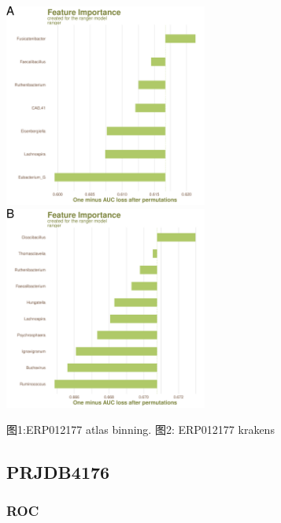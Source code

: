 \documentclass[
]{article}
\begin{document}
\includegraphics[width=0.5\textwidth,height=0.5\textheight]{../../Analysis_shotgun_ERP012177/03_ML/shotgun/atlas_binning/ERP012177_binning_best.model_draw_feature_importance_plot.png}
\includegraphics[width=0.5\textwidth,height=0.5\textheight]{../../Analysis_shotgun_ERP012177/03_ML/shotgun/krakens/ERP012177_best.model_draw_feature_importance_plot.png}

图1:ERP012177 atlas binning. 图2: ERP012177 krakens

\hypertarget{prjdb4176}{%
\subsection{PRJDB4176}\label{prjdb4176}}

\hypertarget{roc-1}{%
\subsubsection{ROC}\label{roc-1}}
\end{document}
